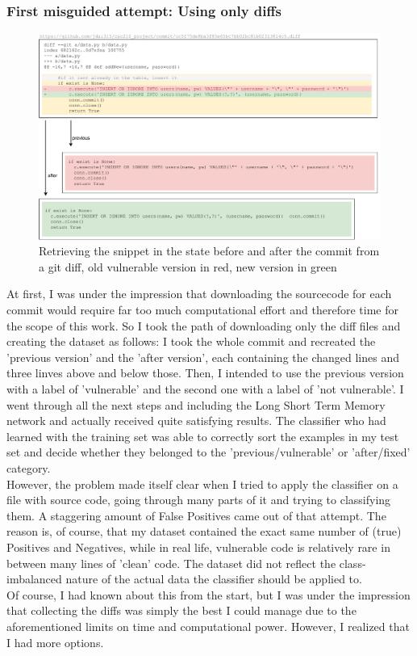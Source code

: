 \documentclass[
	a4paper,
	pagesize,
	pdftex,
	12pt,
	twoside, %
	BCOR=5mm, %
	ngerman,
	fleqn,
	final,
	]{scrartcl}
\begin{document}
\subsubsection{First misguided attempt: Using only diffs}

\begin{figure}[ht]
	\centering
	\includegraphics[width=\linewidth]{img/GitCommitPreviousAfter}
	\caption{Retrieving the snippet in the state before and after the commit from a git diff, old vulnerable version in red, new version in green}
	\label{fig:gitdiff}
\end{figure}

At first, I was under the impression that downloading the sourcecode for each commit would require far too much computational effort and therefore time for the scope of this work. So I took the path of downloading only the diff files and creating the dataset as follows: I took the whole commit and recreated the 'previous version' and the 'after version', each containing the changed lines and three linves above and below those. Then, I intended to use the previous version with a label of 'vulnerable' and the second one with a label of 'not vulnerable'. I went through all the next steps and including the Long Short Term Memory network and actually received quite satisfying results. The classifier who had learned with the training set was able to correctly sort the examples in my test set and decide whether they belonged to the 'previous/vulnerable' or 'after/fixed' category.\\
However, the problem made itself clear when I tried to apply the classifier on a file with source code, going through many parts of it and trying to classifying them. A staggering amount of False Positives came out of that attempt. The reason is, of course, that my dataset contained the exact same number of (true) Positives and Negatives, while in real life, vulnerable code is relatively rare in between many lines of 'clean' code. The dataset did not reflect the class-imbalanced nature of the actual data the classifier should be applied to.\\
Of course, I had known about this from the start, but I was under the impression that collecting the diffs was simply the best I could manage due to the aforementioned limits on time and computational power. However, I realized that I had more options.
\end{document}
